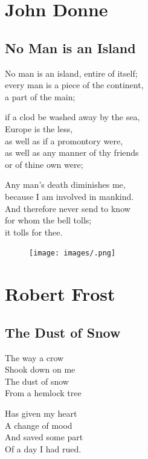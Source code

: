 \documentclass[]{book}
\renewenvironment{quote}{\begin{VF}}{\end{VF}}
\begin{document}
\chapter{John Donne}\label{john-donne}

\section{No Man is an Island}\label{no-man-is-an-island}

\begin{quote}
No man is an island, entire of itself;\\
every man is a piece of the continent,\\
a part of the main;

if a clod be washed away by the sea,\\
Europe is the less,\\
as well as if a promontory were,\\
as well as any manner of thy friends\\
or of thine own were;

Any man's death diminishes me,\\
because I am involved in mankind.\\
And therefore never send to know\\
for whom the bell tolls;\\
it tolls for thee.
\end{quote}

\begin{figure}[htbp]
\centering
\texttt{[image: images/.png]}
\caption{}
\end{figure}

\chapter{Robert Frost}\label{robert-frost}

\section{The Dust of Snow}\label{the-dust-of-snow}

\begin{quote}
The way a crow\\
Shook down on me\\
The dust of snow\\
From a hemlock tree

Has given my heart\\
A change of mood\\
And saved some part\\
Of a day I had rued.
\end{quote}
\end{document}
